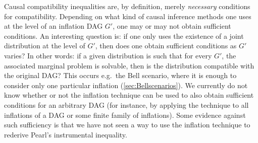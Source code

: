 {Causal compatibility inequalities are, by definition, merely {\em necessary} conditions for compatibility. Depending on what kind of causal inference methods one uses at the level of an inflation DAG $G'$, one may or may not obtain sufficient conditions. An interesting question is: if one only uses the existence of a joint distribution at the level of $G'$, then does one obtain sufficient conditions as $G'$ varies? In other words: if a given distribution is such that for every $G'$, the associated marginal problem is solvable, then is the distribution compatible with the original DAG? This occurs e.g.~the Bell scenario, where it is enough to consider only one particular inflation (\cref{sec:Bellscenarios}).  We currently do not know whether or not the inflation technique can be used to also obtain sufficient conditions for an arbitrary DAG (for instance, by applying the technique to all inflations of a DAG or some finite family of inflations).
Some evidence against such sufficiency is that we have not seen a way to use the inflation technique to rederive Pearl's instrumental inequality.






}
